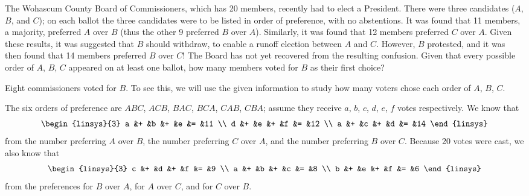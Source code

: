 \begin{exercises}
     \cite{Wohascum2}
     The Wohascum County Board of Commissioners, which has 20 members, 
     recently had to elect a President.
     There were three candidates ($A$, $B$, and $C$); on each ballot
     the three
     candidates were to be listed in order of preference, with no abstentions.
     It was found that 11 members, a majority, preferred $A$ over $B$
     (thus the other 9 preferred $B$ over $A$).
     Similarly, it was found that 12 members preferred $C$ over $A$.
     Given these results, it was suggested that $B$ should withdraw, to enable
     a runoff election between $A$ and $C$.
     However, $B$ protested, and it was then found that 14 members preferred
     $B$ over $C$!
     The Board has not yet recovered from the resulting confusion.
     Given that every possible order of $A$, $B$, $C$ appeared on at least 
     one ballot, how many members voted for $B$ as their first choice?
     \begin{answer}
       \answerasgiven
       Eight commissioners voted for $B$.
       To see this, we will use the given information to study how many voters
       chose each order of $A$, $B$, $C$.

       The six orders of preference are $ABC$, $ACB$, $BAC$, $BCA$, $CAB$,
       $CBA$; assume they receive $a$, $b$, $c$, $d$, $e$, $f$ votes 
       respectively.
       We know that
       \begin{equation*}
         \begin{linsys}{3}
           a  &+  &b  &+  &e  &=  &11  \\
           d  &+  &e  &+  &f  &=  &12  \\
           a  &+  &c  &+  &d  &=  &14
         \end{linsys}
       \end{equation*}
       from the number preferring $A$ over $B$, the number preferring
       $C$ over $A$, and the number preferring $B$ over $C$.
       Because 20 votes were cast, we also know that
       \begin{equation*}
         \begin{linsys}{3}
           c  &+  &d  &+  &f  &=  &9  \\
           a  &+  &b  &+  &c  &=  &8  \\
           b  &+  &e  &+  &f  &=  &6
         \end{linsys}
       \end{equation*}
       from the preferences for $B$ over $A$, for $A$ over $C$, and for
       $C$ over $B$.


\end{answer}
\end{exercises}
